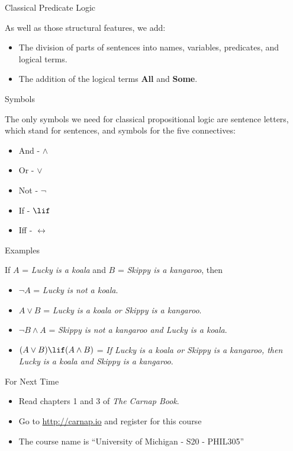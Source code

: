 \documentclass[ignorenonframetext,]{beamer}
\providecommand{\tightlist}{%
  \setlength{\itemsep}{0pt}\setlength{\parskip}{0pt}}
\renewcommand{\,}{\text{, }}
\begin{document}
\begin{frame}{Classical Predicate Logic}
\protect\hypertarget{classical-predicate-logic}{}

As well as those structural features, we add:

\begin{itemize}
\tightlist
\item
  The division of parts of sentences into names, variables, predicates,
  and logical terms.
\item
  The addition of the logical terms \textbf{All} and \textbf{Some}.
\end{itemize}

\end{frame}

\begin{frame}{Symbols}
\protect\hypertarget{symbols}{}

The only symbols we need for classical propositional logic are sentence
letters, which stand for sentences, and symbols for the five
connectives:

\begin{itemize}
\tightlist
\item
  And - \(\wedge\)
\item
  Or - \(\vee\)
\item
  Not - \(\neg\)
\item
  If - \(\lif\)
\item
  Iff - \(\leftrightarrow\)
\end{itemize}

\end{frame}

\begin{frame}{Examples}
\protect\hypertarget{examples}{}

If \(A\) = \emph{Lucky is a koala} and \(B\) = \emph{Skippy is a
kangaroo}, then

\begin{itemize}[<+->]
\tightlist
\item
  \(\neg A\) = \emph{Lucky is not a koala}.
\item
  \(A \vee B\) = \emph{Lucky is a koala or Skippy is a kangaroo}.
\item
  \(\neg B \wedge A\) = \emph{Skippy is not a kangaroo and Lucky is a
  koala}.
\item
  \((A \vee B) \lif (A \wedge B)\) = \emph{If Lucky is a koala or Skippy
  is a kangaroo, then Lucky is a koala and Skippy is a kangaroo}.
\end{itemize}

\end{frame}

\begin{frame}{For Next Time}
\protect\hypertarget{for-next-time}{}

\begin{itemize}
\tightlist
\item
  Read chapters 1 and 3 of \emph{The Carnap Book}.
\item
  Go to \url{http://carnap.io} and register for this course
\item
  The course name is ``University of Michigan - S20 - PHIL305''
\end{itemize}

\end{frame}
\end{document}
